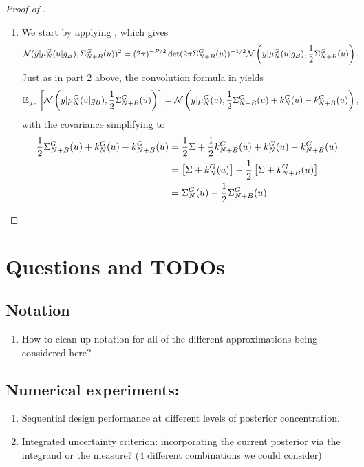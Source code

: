 \documentclass[12pt]{article}
\begin{document}
\begin{proof} [Proof of ]
\begin{enumerate}
\item We start by applying , which gives 
\begin{align*}
\Gaussian(\obs | \emMean[\Ndesign]{\fwd}(\Par| \designBatchFwd), \CovComb[\Naugment](\Par))^2
&= (2\pi)^{-\dimObs/2} \det(2\pi \CovComb[\Naugment](\Par))^{-1/2} 
\Gaussian\left(\obs | \emMean[\Ndesign]{\fwd}(\Par| \designBatchFwd), \frac{1}{2}\CovComb[\Naugment](\Par)\right). 
\end{align*}
Just as in part 2 above, the convolution formula in  yields 
\begin{align*}
\E_{\designBatchFwd}\left[\Gaussian\left(\obs | \emMean[\Ndesign]{\fwd}(\Par| \designBatchFwd), \frac{1}{2}\CovComb[\Naugment](\Par)\right) \right] 
&= \Gaussian\left(\obs | \emMean[\Ndesign]{\fwd}(\Par), \frac{1}{2}\CovComb[\Naugment](\Par) + \emKer[\Ndesign]{\fwd}(\Par) - \emKer[\Naugment]{\fwd}(\Par)\right), 
\end{align*}
with the covariance simplifying to 
\begin{align*}
\frac{1}{2}\CovComb[\Naugment](\Par) + \emKer[\Ndesign]{\fwd}(\Par) - \emKer[\Naugment]{\fwd}(\Par)
&= \frac{1}{2}\likPar + \frac{1}{2}\emKer[\Naugment]{\fwd}(\Par) + \emKer[\Ndesign]{\fwd}(\Par) - \emKer[\Naugment]{\fwd}(\Par) \\ 
&= \left[\likPar + \emKer[\Ndesign]{\fwd}(\Par) \right] - \frac{1}{2}\left[\likPar + \emKer[\Naugment]{\fwd}(\Par) \right] \\
&= \CovComb[\Ndesign](\Par) - \frac{1}{2} \CovComb[\Naugment](\Par). 
\end{align*}
 
\end{enumerate}

\end{proof}


\section{Questions and TODOs}
\subsection{Notation}
\begin{enumerate}
\item How to clean up notation for all of the different approximations being considered here? 
\end{enumerate}

\subsection{Numerical experiments:}
\begin{enumerate}
\item Sequential design performance at different levels of posterior concentration. 
\item Integrated uncertainty criterion: incorporating the current posterior via the integrand or the measure? 
(4 different combinations we could consider) 
\end{enumerate}
\end{document}
